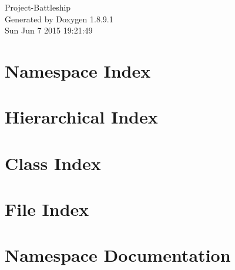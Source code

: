 \documentclass[twoside]{book}
\newcommand{\+}{\discretionary{\mbox{\scriptsize$\hookleftarrow$}}{}{}}
\newcommand{\clearemptydoublepage}{%
  \newpage{\pagestyle{empty}\cleardoublepage}%
}
\begin{document}
\hypersetup{pageanchor=false,
             bookmarks=true,
             bookmarksnumbered=true,
             pdfencoding=unicode
            }
\begin{titlepage}
\vspace*{7cm}
\begin{center}%
{\Large Project-\/\+Battleship }\\
\vspace*{1cm}
{\large Generated by Doxygen 1.8.9.1}\\
\vspace*{0.5cm}
{\small Sun Jun 7 2015 19:21:49}\\
\end{center}
\end{titlepage}
\clearemptydoublepage
\tableofcontents
\clearemptydoublepage
{}
\hypersetup{pageanchor=true}

\chapter{Namespace Index}

\chapter{Hierarchical Index}

\chapter{Class Index}

\chapter{File Index}

\chapter{Namespace Documentation}





\end{document}
